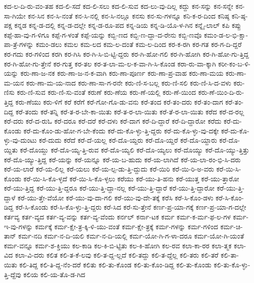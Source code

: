 {ಕದ-ಲ-ದಿ-ರು-ವಂ-ತಹ
ಕದ-ಲಿ-ಸದೆ
ಕದ-ಲಿ-ಸಲು
ಕದ-ಲಿ-ಸುವ
ಕದ-ಲು-ವು-ದಿಲ್ಲ
ಕದ್ದು
ಕನ-ಸನ್ನು
ಕನ-ಸನ್ನೇ
ಕನ-ಸಾ-ಗಿಯೇ
ಕನ-ಸಿನ
ಕನ-ಸಿ-ನಂತೆ
ಕನ-ಸಿ-ನಲ್ಲಿ
ಕನ-ಸಿ-ನಲ್ಲೂ
ಕನಸು
ಕನ-ಸು-ಗಳನ್ನೂ
ಕನಿ-ಕ-ರ-ದಿಂದ
ಕನಿಷ್ಠ
ಕನಿ-ಷ್ಠ-ಪಕ್ಷ
ಕನ್ನಡ
ಕನ್ನ-ಡ-ದಲ್ಲಿ
ಕನ್ನ-ಡ-ದಲ್ಲೇ
ಕನ್ನ-ಡ-ರೂ-ಪದ
ಕನ್ನ-ಡಿಯ
ಕನ್ನ-ಡಿ-ಯೊ-ಳ-ಗಿನ
ಕನ್ನೈ-ಲಾಲ್
ಕಪಿ
ಕಪ್ಪು
ಕಪ್ಪೆ-ಹಾ-ವು-ಗ-ಳಿಗೂ
ಕಪ್ಪೆ-ಗ-ಳಂತೆ
ಕಪ್ಪೆ-ಯನ್ನು
ಕಬ್ಬಿ-ಣದ
ಕಬ್ಬಿ-ಣ-ದ್ದಾ-ದ-ರೇನು
ಕಬ್ಬಿ-ಣವೊ
ಕಮಂ-ಡ-ಲ-ಭಿ-ಕ್ಷಾ-ಪಾ-ತ್ರೆ-ಗಳನ್ನು
ಕಮಂ-ಡಲು
ಕಮಲ
ಕಮ-ಲದ
ಕಮ-ಲ-ದಂತೆ
ಕಮ-ಲ-ದಿಂದ
ಕರ-ಕ-ರಗಿ
ಕರ-ಗತ
ಕರ-ಗ-ದಿ-ದ್ದರೆ
ಕರ-ಗದು
ಕರ-ಗಳಿಂದ
ಕರಗಿ
ಕರ-ಗಿಸಿ
ಕರ-ಗಿ-ಸಿ-ಬಿ-ಟ್ಟಿ-ದ್ದರು
ಕರ-ಗಿ-ಹೋ-ಗಲಿ
ಕರ-ಗಿ-ಹೋಗಿ
ಕರ-ಗಿ-ಹೋ-ಗು-ತ್ತಿದ್ದ
ಕರ-ಗಿ-ಹೋ-ಗು-ತ್ತೇನೆ
ಕರ-ಗುತ್ತ
ಕರ-ತಲ
ಕರ-ತ-ಲಾ-ಮ-ಲ-ಕ-ವಾ-ಗಿ-ಸಿ-ಕೊಂಡ
ಕರಾ-ರು-ವಾ-ಕ್ಕಾಗಿ
ಕರೀ-ಕಂ-ಬ-ಳಿ-ಯನ್ನು
ಕರು-ಣಾ-ಜ-ನಕ
ಕರು-ಣಾ-ಜ-ನ-ಕ-ವಾಗಿ
ಕರು-ಣಾ-ಪೂರ್ಣ
ಕರು-ಣಾ-ಪ್ರ-ವಾಹ
ಕರು-ಣಾ-ಮಯ
ಕರು-ಣಾ-ಮ-ಯನ
ಕರು-ಣಾ-ಮ-ಯ-ನಾದ
ಕರು-ಣಾ-ಸಾ-ಗ-ರನೇ
ಕರು-ಣಿ-ಸ-ಬಲ್ಲ
ಕರು-ಣಿ-ಸಲಿ
ಕರು-ಣಿ-ಸಿ-ದ-ವಳು
ಕರು-ಣಿಸು
ಕರು-ಣಿ-ಸುವ
ಕರು-ಣಿ-ಸು-ವಂತೆ
ಕರುಣೆ
ಕರು-ಣೆಯ
ಕರು-ಣೆ-ಯಲ್ಲಿ
ಕರು-ಣೆ-ಯಿಂದ
ಕರು-ಣೆ-ಯಿಂ-ದಿ-ರು-ತ್ತಿದ್ದ
ಕರು-ಣೆಯು
ಕರು-ಳಿಗೆ
ಕರೆ
ಕರೆಗೆ
ಕರೆ-ಗೋ-ಗೊ-ಡು-ವನು
ಕರೆ-ತಂದ
ಕರೆ-ತಂ-ದರು
ಕರೆ-ತಂ-ದಾಗ
ಕರೆ-ತಂ-ದಿದ್ದ
ಕರೆ-ತಂದು
ಕರೆ-ತನ್ನಿ
ಕರೆ-ತ-ರ-ಬೇ-ಕಾ-ಯಿತು
ಕರೆ-ತ-ರ-ಲಾ-ಯಿತು
ಕರೆ-ತೆ-ರ-ಲಾ-ಯಿತು
ಕರೆದ
ಕರೆ-ದ-ರಲ್ಲ
ಕರೆ-ದರು
ಕರೆ-ದ-ರುಓ
ಕರೆ-ದರೂ
ಕರೆ-ದರೆ
ಕರೆ-ದಳು
ಕರೆ-ದಾಗ
ಕರೆ-ದಿ-ದ್ದಾರೆ
ಕರೆ-ದಿ-ದ್ದಾರೋ
ಕರೆದು
ಕರೆ-ದು-ಕೊಂಡು
ಕರೆ-ದು-ಕೊಂ-ಡು-ಹೋ-ಗ-ಬೇ-ಕೆಂದು
ಕರೆ-ದು-ಕೊ-ಳ್ಳು-ತ್ತಿ-ದ್ದರು
ಕರೆ-ದು-ಕೊ-ಳ್ಳು-ವು-ದಕ್ಕೇ
ಕರೆ-ದು-ಕೊ-ಳ್ಳು-ವು-ದುಂಟು
ಕರೆ-ದುದು
ಕರೆದೆ
ಕರೆ-ದೆ-ಯಲ್ಲ
ಕರೆ-ದೊ-ಯ್ದರು
ಕರೆ-ದೊ-ಯ್ದರೆ
ಕರೆ-ದೊ-ಯ್ದಾರು
ಕರೆ-ದೊ-ಯ್ದಿತು
ಕರೆ-ದೊಯ್ದು
ಕರೆ-ದೊ-ಯ್ಯ-ತ್ತಿ-ರುವ
ಕರೆ-ದೊ-ಯ್ಯಲಿ
ಕರೆ-ದೊ-ಯ್ಯಲು
ಕರೆ-ದೊಯ್ಯು
ಕರೆ-ದೊ-ಯ್ಯು-ತ್ತಿತ್ತು
ಕರೆ-ದೊ-ಯ್ಯು-ತ್ತಿದ್ದ
ಕರೆ-ಯನ್ನು
ಕರೆ-ಯನ್ನೂ
ಕರೆ-ಯ-ಬ-ಹುದು
ಕರೆ-ಯ-ಲಾಗಿದೆ
ಕರೆ-ಯ-ಲಾ-ರಂ-ಭಿ-ಸಿ-ದರು
ಕರೆ-ಯ-ಲಾರೆ
ಕರೆ-ಯ-ಲಿಲ್ಲ
ಕರೆ-ಯಲು
ಕರೆ-ಯ-ಲ್ಪ-ಡು-ತ್ತಿ-ದ್ದುದು
ಕರೆ-ಯಿರಿ
ಕರೆ-ಯಿ-ರಿ-ಅ-ವರು
ಕರೆ-ಯಿ-ಸಿ-ಕೊಂಡು
ಕರೆ-ಯಿ-ಸಿ-ಕೊ-ಳ್ಳದೆ
ಕರೆ-ಯಿ-ಸಿ-ಕೊ-ಳ್ಳಲು
ಕರೆಯು
ಕರೆ-ಯು-ತಿ-ಹನು
ಕರೆ-ಯುತ್ತ
ಕರೆ-ಯು-ತ್ತಾರೋ
ಕರೆ-ಯು-ತ್ತಿದ್ದ
ಕರೆ-ಯು-ತ್ತಿ-ದ್ದರೂ
ಕರೆ-ಯು-ತ್ತಿ-ದ್ದಾ-ನಲ್ಲ
ಕರೆ-ಯು-ತ್ತಿ-ದ್ದಾರೆ
ಕರೆ-ಯು-ತ್ತಿ-ದ್ದಾರೋ
ಕರೆ-ಯು-ತ್ತಿ-ದ್ದಾಳೆ
ಕರೆ-ಯು-ತ್ತೇ-ವೆಯೋ
ಕರೆ-ಯು-ವು-ದಾ-ಗಲಿ
ಕರೆ-ಯು-ವು-ದೇ-ತಕ್ಕೆ
ಕರೆಸಿ
ಕರೆ-ಸಿ-ಕೊಂ-ಡಳು
ಕರೆ-ಸಿ-ಕೊಂ-ಡಿದ್ದ
ಕರೆ-ಸಿ-ಕೊಂಡು
ಕರೆ-ಸಿ-ಕೊ-ಳ್ಳು-ತ್ತಿ-ದ್ದರು
ಕರೆ-ಸಿದ
ಕರೆ-ಸು-ತ್ತೇನೆ
ಕರ್ಣ-ಪ್ರ-ಯಾ-ಗಕ್ಕೆ
ಕರ್ಣ-ಪ್ರ-ಯಾ-ಗ-ದಲ್ಲೇ
ಕರ್ತವ್ಯ
ಕರ್ತ-ವ್ಯದ
ಕರ್ತ-ವ್ಯ-ವನ್ನು
ಕರ್ತ-ವ್ಯ-ವೆಂದು
ಕರ್ನಲ್
ಕರ್ನಾ-ಟಕ
ಕರ್ಮ
ಕರ್ಮ-ಕ-ರ್ಮ-ಫ-ಲ-ಗಳ
ಕರ್ಮ-ಇ-ವು-ಗಳನ್ನು
ಕರ್ಮಕ್ಕೆ
ಕರ್ಮ-ಕ್ಷೇ-ತ್ರ-ಕ್ಕಿ-ಳಿ-ಯು-ವಂತೆ
ಕರ್ಮ-ಕ್ಷೇ-ತ್ರಕ್ಕೆ
ಕರ್ಮ-ಗಳನ್ನು
ಕರ್ಮ-ಗಳಿಂದ
ಕರ್ಮ-ಚಿ-ತಾನ್
ಕರ್ಮ-ನದಿ
ಕರ್ಮ-ನ-ದಿ-ಯಲಿ
ಕರ್ಮ-ನ-ದಿ-ಯಲ್ಲಿ
ಕರ್ಮ-ಯೋ-ಗಿ-ಗ-ಳಾ-ದರೂ
ಕರ್ಮ-ಯೋ-ಗಿ-ಯಂತೆ
ಕರ್ಮ-ವನ್ನೂ
ಕರ್ಮ-ಶ-ಕ್ತಿಯು
ಕಲ-ಕಾಡಿ
ಕಲ-ಕಿ-ಬಿ-ಟ್ಟಿತು
ಕಲ-ಕಿ-ಹೋಗಿ
ಕಲ-ರವ
ಕಲಾ-ಕಾ-ರರ
ಕಲಾ-ತ್ಮಕ
ಕಲಾ-ವಿದ
ಕಲಾ-ವಿ-ದರು
ಕಲಿತ
ಕಲಿ-ತ-ಕೆ-ಲವು
ಕಲಿ-ತ-ದ್ದ-ಲ್ಲದೆ
ಕಲಿ-ತದ್ದು
ಕಲಿ-ತ-ದ್ದೆಲ್ಲ
ಕಲಿ-ತರು
ಕಲಿ-ತರೆ
ಕಲಿ-ತಾ-ಯಿತು
ಕಲಿ-ತಿದ್ದ
ಕಲಿ-ತಿ-ದ್ದ-ನೆಂ-ದರೆ
ಕಲಿತು
ಕಲಿ-ತು-ಕೊಂಡ
ಕಲಿ-ತು-ಕೊಂ-ಡಿದ್ದ
ಕಲಿ-ತು-ಕೊಂಡು
ಕಲಿ-ತು-ಕೊ-ಳ್ಳು-ತ್ತಿ-ದ್ದೆವು
ಕಲಿಯ
ಕಲಿ-ಯ-ತೊ-ಡ-ಗಿದ
}

